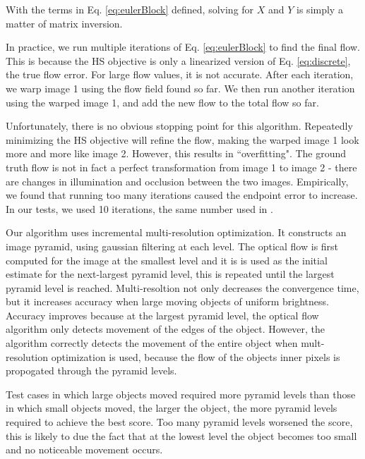 \documentclass[10pt,twocolumn,letterpaper]{article}
\begin{document}
With the terms in Eq. \ref{eq:eulerBlock} defined, solving for $X$ and $Y$ is simply a matter of matrix inversion.

In practice, we run multiple iterations of Eq. \ref{eq:eulerBlock} to find the final flow.  This is because the HS objective is only a linearized version of Eq. \ref{eq:discrete}, the true flow error.  For large flow values, it is not accurate.  After each iteration, we warp image 1 using the flow field found so far.  We then run another iteration using the warped image 1, and add the new flow to the total flow so far.

Unfortunately, there is no obvious stopping point for this algorithm.  Repeatedly minimizing the HS objective will refine the flow, making the warped image 1 look more and more like image 2.  However, this results in ``overfitting".  The ground truth flow is not in fact a perfect transformation from image 1 to image 2 - there are changes in illumination and occlusion between the two images.  Empirically, we found that running too many iterations caused the endpoint error to increase.  In our tests, we used 10 iterations, the same number used in \cite{sun}.

Our algorithm uses incremental multi-resolution optimization. It constructs an image pyramid, using gaussian filtering at each level. The optical flow is first computed for the image at the smallest level and it is is used as the initial estimate for the next-largest pyramid level, this is repeated until the largest pyramid level is reached. Multi-resoltion not only decreases the convergence time, but it increases accuracy when large moving objects of uniform brightness. Accuracy improves because at the largest pyramid level, the optical flow algorithm only detects movement of the edges of the object. However, the algorithm correctly detects the movement of the entire object when mult-resolution optimization is used, because the flow of the objects inner pixels is propogated through the pyramid levels.

Test cases in which large objects moved required more pyramid levels than those in which small objects moved, the larger the object, the more pyramid levels required to achieve the best score. Too many pyramid levels worsened the score, this is likely to due the fact that at the lowest level the object becomes too small and no noticeable movement occurs.
\end{document}

